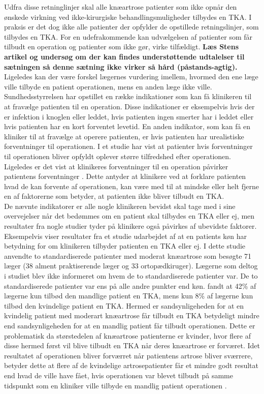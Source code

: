 Udfra disse retninglinjer skal alle knæartrose patienter som ikke opnår den ønskede virkning ved ikke-kirurgiske behandlingsmuligheder tilbydes en TKA. I praksis er det dog ikke alle patienter der opfylder de opstillede retningslinjer, som tilbydes en TKA. \citep{borkhoff2008} For en udefrakommende kan udvælgelsen af patienter som får tilbudt en operation og patienter som ikke gør, virke tilfældigt. \textbf{Læs Stens artikel og undersøg om der kan findes understøttende udtalelser til sætningen så denne sætning ikke virker så hård (påstands-agtig).} Ligeledes kan der være forskel lægernes vurdering imellem, hvormed den ene læge ville tilbyde en patient operationen, mens en anden læge ikke ville. Sundhedsstyrrelsen har opstillet en række indikationer som kan få klinikeren til at fravælge patienten til en operation. Disse indikationer er eksempelvis hvis der er infektion i knoglen eller leddet, hvis patienten ingen smerter har i leddet eller hvis patienten har en kort forventet levetid. En anden indikator, som kan få en kliniker til at fravælge at operere patienten, er hvis patienten har urealistiske forventninger til operationen. \citep{brostrom2012} I et studie har \cite{tejada2010} vist at patienter hvis forventninger til operationen bliver opfyldt oplever større tilfredshed efter operationen. Ligeledes er det vist at klinikeres forventninger til en operation påvirker patientens forventninger \citep{tejada2010}. Dette antyder at klinikere ved at forklare patienten hvad de kan forvente af operationen, kan være med til at mindske eller helt fjerne en af faktorerne som betyder, at patienten ikke bliver tilbudt en TKA. \\
De nævnte indikatorer er alle nogle klinikeren bevidst skal tage med i sine overvejelser når det bedømmes om en patient skal tilbydes en TKA eller ej, men resultater fra nogle studier tyder på klinikere også påvirkes af ubevidste faktorer. Eksempelvis viser resultater fra et studie udarbejdet af \cite{borkhoff2008} at en patients køn har betydning for om klinikeren tilbyder patienten en TKA eller ej. I dette studie anvendte \cite{borkhoff2008} to standardiserede patienter med moderat knæartrose som besøgte 71 læger (38 alment praktiserende læger og 33 ortopædkiruger). Lægerne som deltog i studiet blev ikke informeret om hvem de to standardiserede patienter var. De to standardiserede patienter var ens på alle andre punkter end køn. \cite{borkhoff2008} fandt at 42\% af lægerne kun tilbød den mandlige patient en TKA, mens kun 8\% af lægerne kun tilbød den kvindelige patient en TKA. Hermed er sandsynligeheden for at en kvindelig patient med moderart knæartrose får tilbudt en TKA betydeligt mindre end sandsynligeheden for at en mandlig patient får tilbudt operationen. Dette er problematisk da størstedelen af knæartrose patienterne er kvinder, hvor flere af disse hermed først vil blive tilbudt en TKA når deres knæartrose er forværet. Idet resultatet af operationen bliver forværret når patientens artrose bliver sværrere, betyder dette at flere af de kvindelige artrosepatienter får et mindre godt resultat end hvad de ville have fået, hvis operationen var blevet tilbudt på samme tidspunkt som en kliniker ville tilbyde en mandlig patient operationen \citep{borkhoff2008}. \\
